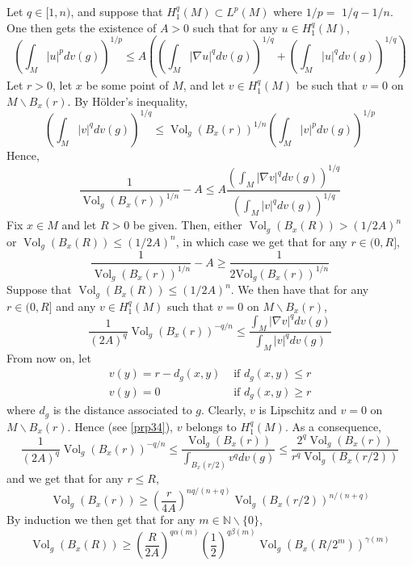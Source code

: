 \documentclass[12pt,hyperref,a4paper,UTF8]{ctexart}
\begin{document}
\begin{Proof}
Let $q \in[1, n)$, and suppose that $H_1^q(M) \subset L^p(M)$ where $1 / p=$ $1 / q-1 / n$. One then gets the existence of $A>0$ such that for any $u \in H_1^q(M)$,
$$
\left(\int_M|u|^p d v(g)\right)^{1 / p} \leq A\left(\left(\int_M|\nabla u|^q d v(g)\right)^{1 / q}+\left(\int_M|u|^q d v(g)\right)^{1 / q}\right)
$$
Let $r>0$, let $x$ be some point of $M$, and let $v \in H_1^q(M)$ be such that $v=0$ on $M \backslash B_x(r)$. By Hölder's inequality,
$$
\left(\int_M|v|^q d v(g)\right)^{1 / q} \leq \operatorname{Vol}_g\left(B_x(r)\right)^{1 / n}\left(\int_M|v|^p d v(g)\right)^{1 / p}
$$
Hence,
$$
\frac{1}{\operatorname{Vol}_g\left(B_x(r)\right)^{1 / n}}-A \leq A \frac{\left(\int_M|\nabla v|^q d v(g)\right)^{1 / q}}{\left(\int_M|v|^q d v(g)\right)^{1 / q}}
$$
Fix $x \in M$ and let $R>0$ be given. Then, either $\operatorname{Vol}_g\left(B_x(R)\right)>(1 / 2 A)^n$ or $\operatorname{Vol}_g\left(B_x(R)\right) \leq(1 / 2 A)^n$, in which case we get that for any $r \in(0, R]$,
$$
\frac{1}{\operatorname{Vol}_g\left(B_x(r)\right)^{1 / n}}-A \geq \frac{1}{2 \mathrm{Vol}_g\left(B_x(r)\right)^{1 / n}}
$$
Suppose that $\operatorname{Vol}_g\left(B_x(R)\right) \leq(1 / 2 A)^n$. We then have that for any $r \in(0, R]$ and any $v \in H_1^q(M)$ such that $v=0$ on $M \backslash B_x(r)$,
$$
\frac{1}{(2 A)^q} \operatorname{Vol}_g\left(B_x(r)\right)^{-q / n} \leq \frac{\int_M|\nabla v|^q d v(g)}{\int_M|v|^q d v(g)}
$$
From now on, let
$$
\begin{array}{ll}
v(y)=r-d_g(x, y) & \text { if } d_g(x, y) \leq r \\
v(y)=0 & \text { if } d_g(x, y) \geq r
\end{array}
$$
where $d_g$ is the distance associated to $g$. Clearly, $v$ is Lipschitz and $v=0$ on $M \backslash B_x(r)$. Hence (see \autoref{prp34}), $v$ belongs to $H_1^q(M)$. As a consequence,
$$
\frac{1}{(2 A)^q} \operatorname{Vol}_g\left(B_x(r)\right)^{-q / n} \leq \frac{\operatorname{Vol}_g\left(B_x(r)\right)}{\int_{B_{{x}}(r / 2)} v^q d v(g)} \leq \frac{2^q \operatorname{Vol}_g\left(B_x(r)\right)}{r^q \operatorname{Vol}_g\left(B_x(r / 2)\right)}
$$
and we get that for any $r \leq R$,
$$
\operatorname{Vol}_g\left(B_x(r)\right) \geq\left(\frac{r}{4 A}\right)^{n q /(n+q)} \operatorname{Vol}_g\left(B_x(r / 2)\right)^{n /(n+q)}
$$
By induction we then get that for any $m \in \mathbb{N} \backslash\{0\}$,
\begin{equation}
\operatorname{Vol}_g\left(B_x(R)\right) \geq\left(\frac{R}{2 A}\right)^{q \alpha(m)}\left(\frac{1}{2}\right)^{q \beta(m)} \operatorname{Vol}_g\left(B_{x}\left(R / 2^m\right)\right)^{\gamma(m)}

\end{equation}
\end{Proof}
\end{document}
